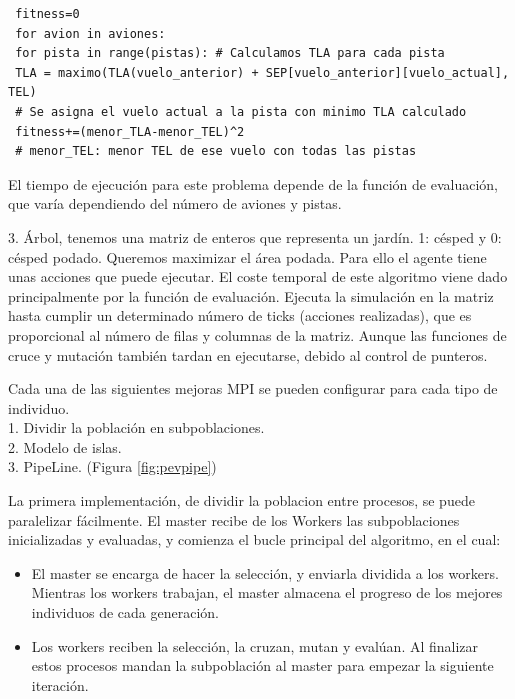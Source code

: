 	\begin{lstlisting}
 fitness=0
 for avion in aviones:
 for pista in range(pistas): # Calculamos TLA para cada pista
 TLA = maximo(TLA(vuelo_anterior) + SEP[vuelo_anterior][vuelo_actual], TEL)
 # Se asigna el vuelo actual a la pista con minimo TLA calculado
 fitness+=(menor_TLA-menor_TEL)^2
 # menor_TEL: menor TEL de ese vuelo con todas las pistas		
	\end{lstlisting}
	
	\noindent El tiempo de ejecución para este problema depende de la función de evaluación, que varía dependiendo del número de aviones y pistas. 
	
	3. Árbol, tenemos una matriz de enteros que representa un jardín. 1: césped y                 0: césped podado. Queremos maximizar el área podada. Para ello el agente tiene unas acciones que puede ejecutar.
	El coste temporal de este algoritmo viene dado principalmente por la función de evaluación. Ejecuta la simulación en la matriz hasta cumplir un determinado número de ticks (acciones realizadas), que es proporcional al número de filas y columnas de la matriz. Aunque las funciones de cruce y mutación también tardan en ejecutarse, debido al control de punteros.
	
	
	
	\begin{flushleft}
		Cada una de las siguientes mejoras MPI se pueden configurar para cada tipo de individuo.\\
		1. Dividir la población en subpoblaciones.\\
		2. Modelo de islas.\\
		3. PipeLine. (Figura \ref{fig:pevpipe})\\
	\end{flushleft}
	
	La primera implementación, de dividir la poblacion entre procesos, se puede paralelizar fácilmente. El master recibe de los Workers las subpoblaciones inicializadas y evaluadas, y comienza el bucle principal del algoritmo, en el cual:
	\begin{itemize}
		\item El master se encarga de hacer la selección, y enviarla dividida a los workers. Mientras los workers trabajan, el master almacena el progreso de los mejores individuos de cada generación.
		\item Los workers reciben la selección, la cruzan, mutan y evalúan. Al finalizar estos procesos mandan la subpoblación al master para empezar la siguiente iteración.
	\end{itemize}
	
